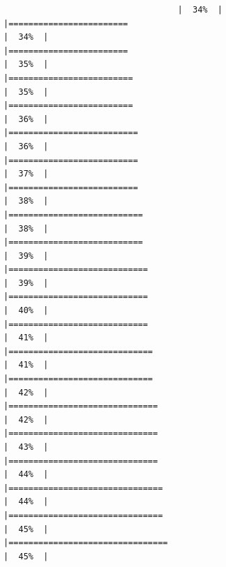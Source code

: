 \documentclass[
  ignorenonframetext,
]{beamer}
\begin{document}
\begin{frame}[fragile]{}
\begin{verbatim}
                                   |  34%  |                                                                              |========================                                              |  34%  |                                                                              |========================                                              |  35%  |                                                                              |=========================                                             |  35%  |                                                                              |=========================                                             |  36%  |                                                                              |==========================                                            |  36%  |                                                                              |==========================                                            |  37%  |                                                                              |==========================                                            |  38%  |                                                                              |===========================                                           |  38%  |                                                                              |===========================                                           |  39%  |                                                                              |============================                                          |  39%  |                                                                              |============================                                          |  40%  |                                                                              |============================                                          |  41%  |                                                                              |=============================                                         |  41%  |                                                                              |=============================                                         |  42%  |                                                                              |==============================                                        |  42%  |                                                                              |==============================                                        |  43%  |                                                                              |==============================                                        |  44%  |                                                                              |===============================                                       |  44%  |                                                                              |===============================                                       |  45%  |                                                                              |================================                                      |  45%  |                                                                              
\end{verbatim}
\end{frame}
\end{document}
